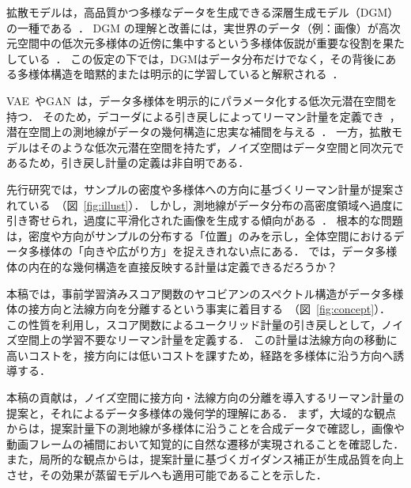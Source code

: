 \documentclass[MIRU,submit]{miru2026j}
\theoremstyle{definition}
\begin{document}
拡散モデルは，高品質かつ多様なデータを生成できる深層生成モデル（DGM）の一種である~\cite{Ho2020,Song2021a,Rombach2022}．
DGM の理解と改善には，実世界のデータ（例：画像）が高次元空間中の低次元多様体の近傍に集中するという多様体仮説が重要な役割を果たしている~\cite{Bengio2012,Fefferman2016}．
この仮定の下では，DGMはデータ分布だけでなく，その背後にある多様体構造を暗黙的または明示的に学習していると解釈される~\cite{Loaiza-ganem2024}．

VAE~\cite{Kingma2014}やGAN~\cite{Goodfellow2014}は，データ多様体を明示的にパラメータ化する低次元潜在空間を持つ．
そのため，デコーダによる引き戻しによってリーマン計量を定義でき~\cite{Gruffaz2025}，潜在空間上の測地線がデータの幾何構造に忠実な補間を与える~\cite{Shao2017,Arvanitidis2018,Chen2018,Arvanitidis2021}．
一方，拡散モデルはそのような低次元潜在空間を持たず，ノイズ空間はデータ空間と同次元であるため，引き戻し計量の定義は非自明である．

先行研究では，サンプルの密度や多様体への方向に基づくリーマン計量が提案されている~\cite{Yu2025,Azeglio2025}（図~\ref{fig:illust}）．
しかし，測地線がデータ分布の高密度領域へ過度に引き寄せられ，過度に平滑化された画像を生成する傾向がある~\cite{Karczewski2025a}．
根本的な問題は，密度や方向がサンプルの分布する「位置」のみを示し，全体空間におけるデータ多様体の「向きや広がり方」を捉えきれない点にある．
では，データ多様体の内在的な幾何構造を直接反映する計量は定義できるだろうか？

本稿では，事前学習済みスコア関数のヤコビアンのスペクトル構造がデータ多様体の接方向と法線方向を分離するという事実に着目する~\cite{Stanczuk2024,Ventura2025}（図~\ref{fig:concept}）．
この性質を利用し，スコア関数によるユークリッド計量の引き戻しとして，ノイズ空間上の学習不要なリーマン計量を定義する．
この計量は法線方向の移動に高いコストを，接方向には低いコストを課すため，経路を多様体に沿う方向へ誘導する．

本稿の貢献は，ノイズ空間に接方向・法線方向の分離を導入するリーマン計量の提案と，それによるデータ多様体の幾何学的理解にある．
まず，大域的な観点からは，提案計量下の測地線が多様体に沿うことを合成データで確認し，画像や動画フレームの補間において知覚的に自然な遷移が実現されることを確認した．
また，局所的な観点からは，提案計量に基づくガイダンス補正が生成品質を向上させ，その効果が蒸留モデルへも適用可能であることを示した．
\end{document}
